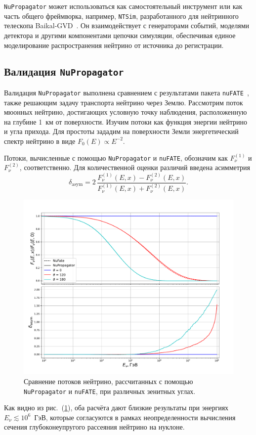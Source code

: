 \texttt{NuPropagator} может использоваться как самостоятельный инструмент или как часть общего фреймворка, например, \texttt{NTSim}, разработанного для нейтринного телескопа Baikal-GVD~\cite{naumov_2025_17340192}. 
Он взаимодействует с генераторами событий, моделями детектора и другими компонентами цепочки симуляции, обеспечивая единое моделирование распространения нейтрино от источника до регистрации.

\subsection{Валидация \texttt{NuPropagator}}
Валидация \texttt{NuPropagator} выполнена сравнением с результатами  пакета \texttt{nuFATE}~\cite{Vincent_2017}, также решающим задачу транспорта нейтрино через Землю. Рассмотрим поток мюонных нейтрино, достигающих условную точку наблюдения,  расположенную на глубине 1~км от поверхности. Изучим потоки как функция энергии нейтрино и угла прихода. Для простоты зададим на поверхности Земли энергетический спектр  нейтрино в виде $F_0(E) \propto E^{-2}$.  

Потоки, вычисленные с помощью \texttt{NuPropagator} и \texttt{nuFATE}, обозначим как $F_\nu^{(1)}$ и $F_\nu^{(2)}$, соответственно. 
Для количественной оценки различий введена асимметрия
\begin{equation}
\delta_{\text{asym}} = 
2\,\frac{F_\nu^{(1)}(E, x) - F_\nu^{(2)}(E, x)}
       {F_\nu^{(1)}(E, x) + F_\nu^{(2)}(E, x)}.
\end{equation}

\begin{figure}[!h]
\centering
\includegraphics[width=0.8\linewidth]{images/NuProp/compNuandNu.pdf}
\caption{Сравнение потоков нейтрино, рассчитанных с помощью \texttt{NuPropagator} и \texttt{nuFATE}, при различных зенитных углах.}
\label{fig:flux_compare}
\end{figure}

Как видно из рис.~(\ref{fig:flux_compare}), оба расчёта дают близкие результаты при энергиях $E_\nu \lesssim 10^6$~ГэВ, которые согласуются в рамках неопределенности вычисления сечения глубоконеупругого рассеяния нейтрино на нуклоне. 
